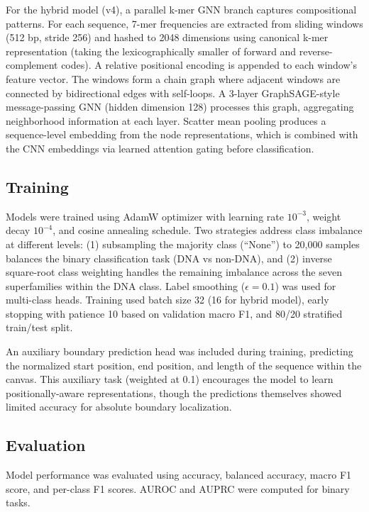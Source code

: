 \documentclass[12pt]{article}
\begin{document}
For the hybrid model (v4), a parallel k-mer GNN branch captures compositional patterns. For each sequence, 7-mer frequencies are extracted from sliding windows (512 bp, stride 256) and hashed to 2048 dimensions using canonical k-mer representation (taking the lexicographically smaller of forward and reverse-complement codes). A relative positional encoding is appended to each window's feature vector. The windows form a chain graph where adjacent windows are connected by bidirectional edges with self-loops. A 3-layer GraphSAGE-style message-passing GNN (hidden dimension 128) processes this graph, aggregating neighborhood information at each layer. Scatter mean pooling produces a sequence-level embedding from the node representations, which is combined with the CNN embeddings via learned attention gating before classification.

\subsection{Training}

Models were trained using AdamW optimizer with learning rate $10^{-3}$, weight decay $10^{-4}$, and cosine annealing schedule. Two strategies address class imbalance at different levels: (1) subsampling the majority class (``None'') to 20,000 samples balances the binary classification task (DNA vs non-DNA), and (2) inverse square-root class weighting handles the remaining imbalance across the seven superfamilies within the DNA class. Label smoothing ($\epsilon = 0.1$) was used for multi-class heads. Training used batch size 32 (16 for hybrid model), early stopping with patience 10 based on validation macro F1, and 80/20 stratified train/test split.

An auxiliary boundary prediction head was included during training, predicting the normalized start position, end position, and length of the sequence within the canvas. This auxiliary task (weighted at 0.1) encourages the model to learn positionally-aware representations, though the predictions themselves showed limited accuracy for absolute boundary localization.

\subsection{Evaluation}

Model performance was evaluated using accuracy, balanced accuracy, macro F1 score, and per-class F1 scores. AUROC and AUPRC were computed for binary tasks.
\end{document}
